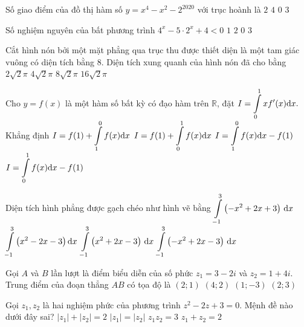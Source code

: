 \begin{ex}%
Số giao điểm của đồ thị hàm số $y=x^4-x^2-2^{2020}$ với trục hoành là
\choice
{\True $2$}
{$4$}
{$0$}
{$3$}

\end{ex}
\begin{ex}%
Số nghiệm nguyên của bất phương trình $4^{x}-5\cdot 2^{x}+4<0$ 
\choice
{\True $1$}
{$2$}
{$0$}
{$3$}

\end{ex}
\begin{ex}%
Cắt hình nón bởi một mặt phẳng qua trục thu được thiết diện là một tam giác vuông có diện tích bằng $8$. Diện tích xung quanh của hình nón đã cho bằng
\choice
{$2\sqrt{2} \pi$}
{$4\sqrt{2} \pi$}
{\True $8\sqrt{2} \pi$}
{$16\sqrt{2} \pi$}

\end{ex}
\begin{ex}%
Cho $y=f(x)$ là một hàm số bất kỳ có đạo hàm trên $\mathbb{R}$, đặt $I=\displaystyle\displaystyle\int\limits_0^1 x f'(x) \mathrm{d} x.$ Khẳng định
\choice
{\True $I=f(1)+\displaystyle\displaystyle\int\limits_1^0 f(x) \mathrm{d} x$}
{$I=f(1)+\displaystyle\displaystyle\int\limits_0^1 f(x) \mathrm{d} x$}
{$I=\displaystyle\displaystyle\int\limits_1^0 f(x) \mathrm{d} x-f(1)$}
{$I=\displaystyle\displaystyle\int\limits_0^1 f(x) \mathrm{d} x-f(1)$}

\end{ex}
\begin{ex}%
Diện tích hình phẳng được gạch chéo như hình vẽ bằng
\choice
{\True $\displaystyle\displaystyle\int\limits_{-1}^3\left(-x^2+2 x+3\right)\mathrm{\,d}x$}
{$\displaystyle\displaystyle\int\limits_{-1}^3\left(x^2-2 x-3\right) \mathrm{d} x$}
{$\displaystyle\displaystyle\int\limits_{-1}^3\left(x^2+2 x-3\right)\mathrm{\,d}x$}
{$\displaystyle\displaystyle\int\limits_{-1}^3\left(-x^2+2 x-3\right)\mathrm{\,d}x$}

\end{ex}
\begin{ex}%
Gọi $A$ và $B$ lần lượt là điểm biểu diễn của số phức $z_1=3-2 i$ và $z_2=1+4 i$. Trung điểm của đoạn thẳng $AB$ có tọa độ là
\choice
{\True $(2; 1)$}
{$(4; 2)$}
{$(1;-3)$}
{$(2; 3)$}

\end{ex}
\begin{ex}%
Gọi $z_1, z_2$ là hai nghiệm phức của phương trình $z^2-2 z+3=0$. Mệnh đề nào dưới đây sai?
\choice
{\True $\left|z_1\right|+\left|z_2\right|=2$}
{$\left|z_1\right|=\left|z_2\right|$}
{$z_1 z_2=3$}
{$z_1+z_2=2$}

\end{ex}

